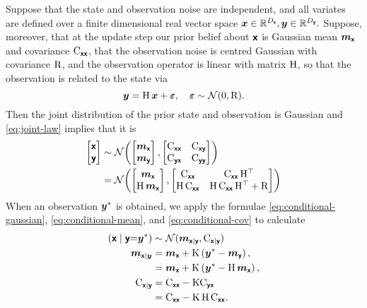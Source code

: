 \documentclass{article}
\begin{document}
Suppose that the state and observation noise are independent, and all variates are defined over a finite dimensional real vector space
$\boldsymbol{x}\in\mathbb{R}^{D_{\boldsymbol{\mathsf{x}}}}, \boldsymbol{y}\in \mathbb{R}^{D_{\boldsymbol{\mathsf{y}}}}.$
Suppose, moreover, that at the update step our prior belief about $\boldsymbol{\mathsf{x}}$ is Gaussian mean \(\boldsymbol{m}_{\boldsymbol{\mathsf{x}}}\) and covariance \(\mathrm{C}_{\boldsymbol{\mathsf{xx}}}\), that the observation noise is centred Gaussian with covariance \(\mathrm{R}\), and the observation operator is linear with matrix \(\mathrm{H}\), so that the observation is related to the state via
\[
\boldsymbol{y} = \mathrm{H}\,\boldsymbol{x} + \boldsymbol{\varepsilon}, \quad \boldsymbol{\varepsilon} \sim \mathcal{N}(0,\mathrm{R}).
\]
Then the joint distribution of the prior state and observation is Gaussian and \eqref{eq:joint-law} implies that it is
\begin{align}
\begin{bmatrix}
\boldsymbol{\mathsf{x}} \\
\boldsymbol{\mathsf{y}}
\end{bmatrix}
&\sim \mathcal{N}\!\left(
    \begin{bmatrix}
    \boldsymbol{m}_{\boldsymbol{\mathsf{x}}} \\
    \boldsymbol{m}_{\boldsymbol{\mathsf{y}}}
    \end{bmatrix},
    \begin{bmatrix}
    \mathrm{C}_{\boldsymbol{\mathsf{xx}}} & \mathrm{C}_{\boldsymbol{\mathsf{xy}}} \\
    \mathrm{C}_{\boldsymbol{\mathsf{yx}}} & \mathrm{C}_{\boldsymbol{\mathsf{yy}}}
    \end{bmatrix}
    \right)\\
&=\mathcal{N}\!\left(
    \begin{bmatrix}
    \boldsymbol{m}_{\boldsymbol{\mathsf{x}}} \\
    \mathrm{H}\,\boldsymbol{m}_{\boldsymbol{\mathsf{x}}}
    \end{bmatrix},
    \begin{bmatrix}
    \mathrm{C}_{\boldsymbol{\mathsf{xx}}} & \mathrm{C}_{\boldsymbol{\mathsf{xx}}}\,\mathrm{H}^\top \\
    \mathrm{H}\,\mathrm{C}_{\boldsymbol{\mathsf{xx}}} & \mathrm{H}\,\mathrm{C}_{\boldsymbol{\mathsf{xx}}}\,\mathrm{H}^\top + \mathrm{R}
    \end{bmatrix}
    \right)
\end{align}
When an observation \(\boldsymbol{y}^*\) is obtained, we apply the formulae
\eqref{eq:conditional-gaussian}, \eqref{eq:conditional-mean}, and \eqref{eq:conditional-cov} to calculate
\begin{align}
\left(\boldsymbol{\mathsf{x}} \mid \boldsymbol{\mathsf{y}} {=} \boldsymbol{y}^*\right)
&\sim\mathcal{N}(\boldsymbol{m}_{\boldsymbol{\mathsf{x}}\mid\boldsymbol{\mathsf{y}}}, \mathrm{C}_{\boldsymbol{\mathsf{x}}\mid\boldsymbol{\mathsf{y}}})\\
\boldsymbol{m}_{\boldsymbol{\mathsf{x}}\mid \boldsymbol{y}}
&= \boldsymbol{m}_{\boldsymbol{\mathsf{x}}} + \mathrm{K} \left(\boldsymbol{y}^* - \boldsymbol{m}_{\boldsymbol{\mathsf{y}}}\right),\\
&= \boldsymbol{m}_{\boldsymbol{\mathsf{x}}} + \mathrm{K} \left(\boldsymbol{y}^* - \mathrm{H}\,\boldsymbol{m}_{\boldsymbol{\mathsf{x}}}\right),\\
\mathrm{C}_{\boldsymbol{\mathsf{x}}\mid\boldsymbol{\mathsf{y}}}
&= \mathrm{C}_{\boldsymbol{\mathsf{xx}}} - \mathrm{K}\mathrm{C}_{\boldsymbol{\mathsf{yx}}}\\
&= \mathrm{C}_{\boldsymbol{\mathsf{xx}}} - \mathrm{K}\,\mathrm{H}\,\mathrm{C}_{\boldsymbol{\mathsf{xx}}}.
\end{align}
\end{document}
